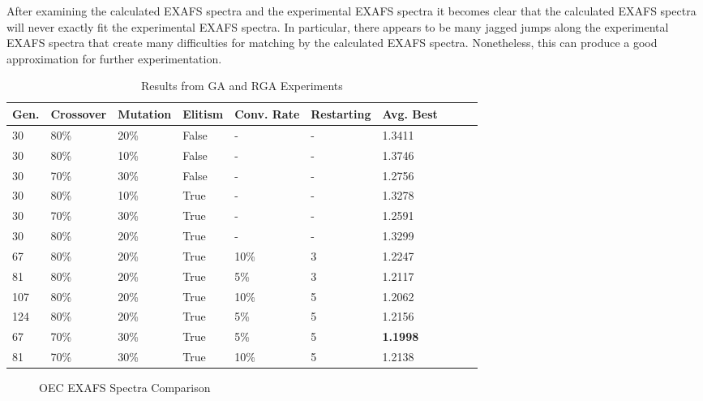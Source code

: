 \documentclass[conference]{IEEEtran}
\begin{document}
After examining the calculated EXAFS spectra and the experimental EXAFS spectra it becomes clear that the calculated EXAFS spectra will never exactly fit the experimental EXAFS spectra. In particular, there appears to be many jagged jumps along the experimental EXAFS spectra that create many difficulties for matching by the calculated EXAFS spectra. Nonetheless, this can produce a good approximation for further experimentation.

\begin{table}
  \caption{Results from GA and RGA Experiments}
  \label{table:sampleRuns}
  \centering
  \begin{tabular}{ | l | l | l | l | l | l | l | l | l | l | }
    \hline
    Gen. & Crossover & Mutation & Elitism & Conv. Rate & Restarting &  Avg. Best \\ \hline \hline
    30 & 80\% & 20\% & False & - & - & 1.3411 \\ \hline
    30 & 80\% & 10\% & False & - & - & 1.3746 \\ \hline
    30 & 70\% & 30\% & False & - & - & 1.2756 \\ \hline
    30 & 80\% & 10\% & True & - & - & 1.3278 \\ \hline
    30 & 70\% & 30\% & True & - & - & 1.2591 \\ \hline
    30 & 80\% & 20\% & True & - & - & 1.3299 \\ \hline
    67 & 80\% & 20\% & True & 10\% & 3 & 1.2247 \\ \hline
    81 & 80\% & 20\% & True & 5\% & 3 & 1.2117 \\ \hline
    107 & 80\% & 20\% & True & 10\% & 5 & 1.2062 \\ \hline
    124 & 80\% & 20\% & True & 5\% & 5 & 1.2156 \\ \hline
    67 & 70\% & 30\% & True & 5\% & 5 & \textbf{1.1998} \\ \hline
    81 & 70\% & 30\% & True & 10\% & 5 & 1.2138 \\ \hline
  \end{tabular}
\end{table}

\begin{figure}
\caption{OEC EXAFS Spectra Comparison}
\label{fig:bestRunEXAFS}
\begin{center}
\end{center}
\end{figure}
\end{document}
